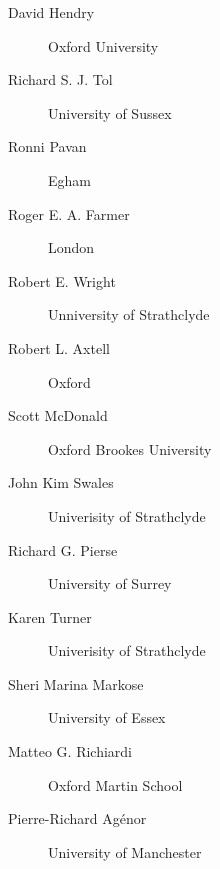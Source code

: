 \documentclass[12pt]{article}
\begin{document}
\begin{description}
\item[David Hendry] Oxford University
\item[Richard S. J. Tol ] University of Sussex
\item[Ronni Pavan] Egham
\item[Roger E. A. Farmer] London
\item[Robert E. Wright] Unniversity of Strathclyde
\item[Robert L. Axtell] Oxford
\item[Scott McDonald] Oxford Brookes University
\item[John Kim Swales] Univerisity of Strathclyde
\item[Richard G. Pierse] University of Surrey
\item[Karen Turner] Univerisity of Strathclyde
\item[Sheri Marina Markose ] University of Essex
\item[Matteo G. Richiardi] Oxford Martin School
\item[Pierre-Richard Agénor ] University of Manchester
\end{description}
\end{document}
